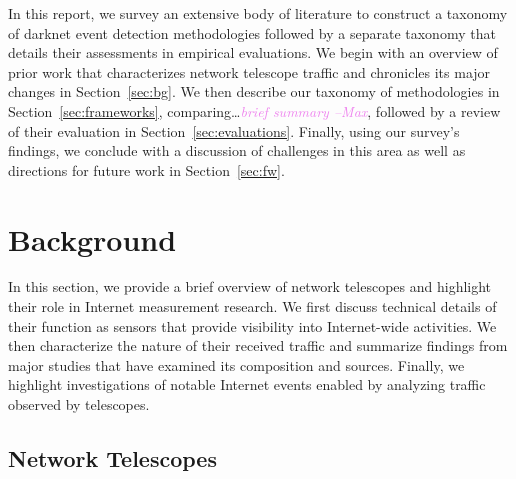 \documentclass[manuscript,nonacm]{acmart}
\newcommand{\maxnote}[1]{\textit{\textcolor{violet}{#1 --Max}}}
\begin{document}


In this report, we survey an extensive body of literature to construct a taxonomy of darknet event detection methodologies followed by a separate taxonomy that details their assessments in empirical evaluations. 
We begin with an overview of prior work that characterizes network telescope traffic and chronicles its major changes in Section~\ref{sec:bg}.
We then describe our taxonomy of methodologies in Section~\ref{sec:frameworks}, comparing\dots\maxnote{brief summary}, followed by a review of their evaluation in Section~\ref{sec:evaluations}.
Finally, using our survey's findings, we conclude with a discussion of challenges in this area as well as directions for future work in Section~\ref{sec:fw}.


\label{sec:bg}
\section{Background}
In this section, we provide a brief overview of network telescopes and highlight their role in Internet measurement research.
We first discuss technical details of their function as sensors that provide visibility into Internet-wide activities. 
We then characterize the nature of their received traffic and summarize findings from major studies that have examined its composition and sources.
Finally, we highlight investigations of notable Internet events enabled by analyzing traffic observed by telescopes.

\label{sec:bg:nt}
\subsection{Network Telescopes}
\end{document}
